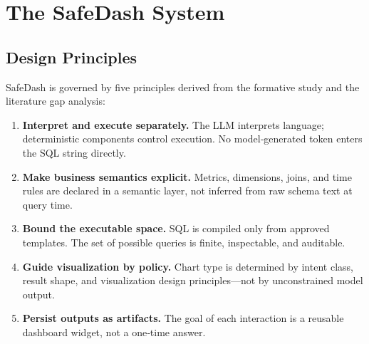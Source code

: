 \documentclass[11pt]{article}
\begin{document}
\section{The SafeDash System}
\subsection{Design Principles}
SafeDash is governed by five principles derived from the formative study and the literature gap analysis:
\begin{enumerate}
  \item \textbf{Interpret and execute separately.} The LLM interprets language; deterministic components control execution. No model‑generated token enters the SQL string directly.
  \item \textbf{Make business semantics explicit.} Metrics, dimensions, joins, and time rules are declared in a semantic layer, not inferred from raw schema text at query time.
  \item \textbf{Bound the executable space.} SQL is compiled only from approved templates. The set of possible queries is finite, inspectable, and auditable.
  \item \textbf{Guide visualization by policy.} Chart type is determined by intent class, result shape, and visualization design principles—not by unconstrained model output.
  \item \textbf{Persist outputs as artifacts.} The goal of each interaction is a reusable dashboard widget, not a one‑time answer.
\end{enumerate}
\end{document}
